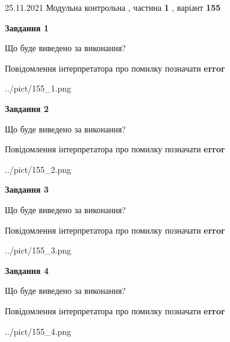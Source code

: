 \documentclass[10pt, ukrainian]{article}
\begin{document}
{25.11.2021 Модульна контрольна , частина \textbf { 1 }, варіант  \No \textbf { 155 }\par}
{
\begin {large}

{\begin {center}\textbf{Завдання 1}\end {center}}\par
Що буде виведено за виконання? \par
Повідомлення інтерпретатора про помилку позначати \textbf{error}

\begin{center}
	{../pict/155_1.png}
\end{center}
\newpage

{\begin {center}\textbf{Завдання 2}\end {center}}\par
Що буде виведено за виконання? \par
Повідомлення інтерпретатора про помилку позначати \textbf{error}

\begin{center}
	{../pict/155_2.png}
\end{center}
\newpage

{\begin {center}\textbf{Завдання 3}\end {center}}\par
Що буде виведено за виконання? \par
Повідомлення інтерпретатора про помилку позначати \textbf{error}

\begin{center}
	{../pict/155_3.png}
\end{center}
\newpage

{\begin {center}\textbf{Завдання 4}\end {center}}\par
Що буде виведено за виконання? \par
Повідомлення інтерпретатора про помилку позначати \textbf{error}

\begin{center}
	{../pict/155_4.png}
\end{center}
\newpage


\end{large}}
\end{document}
